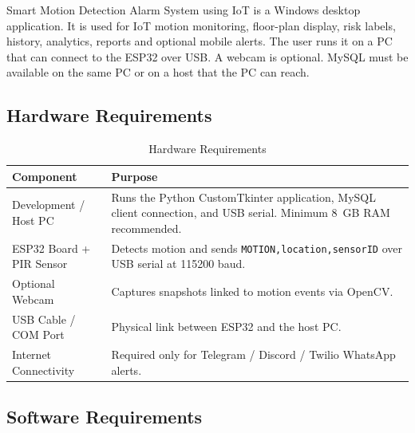 \documentclass[12pt,a4paper]{report}
\begin{document}
Smart Motion Detection Alarm System using IoT is a Windows desktop application. It is used for IoT motion monitoring, floor-plan display, risk labels, history, analytics, reports and optional mobile alerts. The user runs it on a PC that can connect to the ESP32 over USB. A webcam is optional. MySQL must be available on the same PC or on a host that the PC can reach.

\subsection{Hardware Requirements}

\begin{table}[htbp]
\centering
\label{tab:hardware_requirements}
\begin{tabular}{|p{4cm}|p{8cm}|}
\hline
\textbf{Component} & \textbf{Purpose} \\ \hline
Development / Host PC & Runs the Python CustomTkinter application, MySQL client connection, and USB serial. Minimum 8~GB RAM recommended. \\ \hline
ESP32 Board + PIR Sensor & Detects motion and sends \texttt{MOTION,location,sensorID} over USB serial at 115200 baud. \\ \hline
Optional Webcam & Captures snapshots linked to motion events via OpenCV. \\ \hline
USB Cable / COM Port & Physical link between ESP32 and the host PC. \\ \hline
Internet Connectivity & Required only for Telegram / Discord / Twilio WhatsApp alerts. \\ \hline
\end{tabular}
\caption{Hardware Requirements}
\end{table}

\subsection{Software Requirements}
\end{document}
